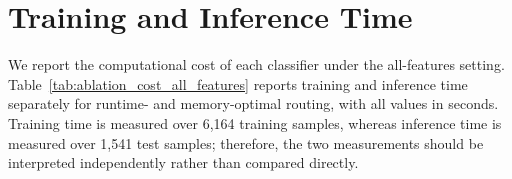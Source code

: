  

\section{Training and Inference Time}
\label{sec:traintime}
We report the computational cost of each classifier under the all-features setting.
Table~\ref{tab:ablation_cost_all_features} reports training and inference time separately for runtime- and memory-optimal routing, with all values in seconds.
Training time is measured over 6,164 training samples, whereas inference time is measured over 1,541 test samples; therefore, the two measurements should be interpreted independently rather than compared directly.

